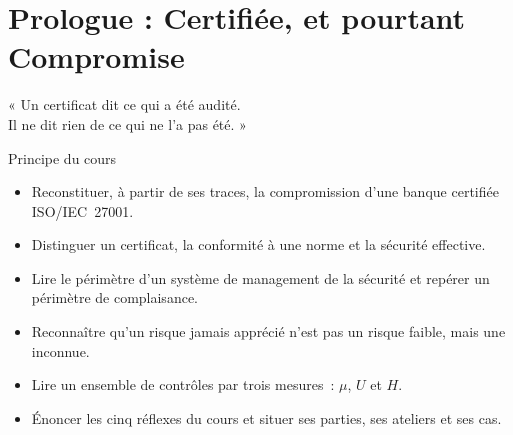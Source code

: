 
\chapter[Certifiée, et pourtant Compromise]{Prologue : Certifiée, et pourtant Compromise}
\label{chap:prologue}

\epigraph{%
    « Un certificat dit ce qui a été audité.\\
    Il ne dit rien de ce qui ne l'a pas été. »%
}{Principe du cours}


\begin{boxobjectifs}
\begin{itemize}
    \item Reconstituer, à partir de ses traces, la compromission d'une banque
          certifiée ISO/IEC~27001.
    \item Distinguer un certificat, la conformité à une norme et la sécurité
          effective.
    \item Lire le périmètre d'un système de management de la sécurité et
          repérer un périmètre de complaisance.
    \item Reconnaître qu'un risque jamais apprécié n'est pas un risque faible,
          mais une inconnue.
    \item Lire un ensemble de contrôles par trois mesures~: $\mu$, $U$ et $H$.
    \item Énoncer les cinq réflexes du cours et situer ses parties, ses
          ateliers et ses cas.
\end{itemize}
\end{boxobjectifs}

